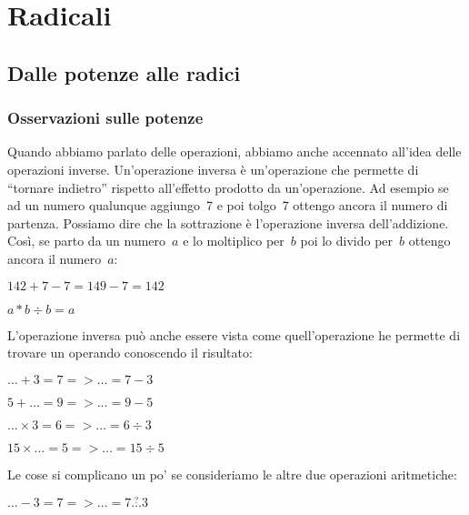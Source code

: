 
\chapter{Radicali}

\section{Dalle potenze alle radici}
\label{sec:radici_potenze_radici}

\subsection{Osservazioni sulle potenze}


Quando abbiamo parlato delle operazioni, abbiamo anche accennato all'idea
delle operazioni inverse. Un'operazione inversa è un'operazione che permette
di ``tornare indietro'' rispetto all'effetto prodotto da un'operazione.
Ad esempio se ad un numero qualunque aggiungo~7 e poi tolgo~7 ottengo ancora il 
numero di partenza. Possiamo dire che la sottrazione è l'operazione inversa 
dell'addizione. Così, se parto da un numero~$a$ e lo moltiplico per~$b$ poi lo 
divido per~$b$ ottengo ancora il numero~$a$:

$142 + 7 - 7 = 149 -7 = 142$

$a * b \div b= a$

L'operazione inversa può anche essere vista come quell'operazione he permette 
di trovare un operando conoscendo il risultato:

$\dots + 3 = 7 => \dots = 7 - 3$

$5 + \dots = 9 => \dots = 9 - 5$

$\dots \times 3 = 6 => \dots = 6 \div 3$

$15 \times \dots = 5 => \dots = 15 \div 5$

Le cose si complicano un po' se consideriamo le altre due operazioni 
aritmetiche:

$\dots - 3 = 7 => \dots = 7 \overset{?}{\dots} 3$

